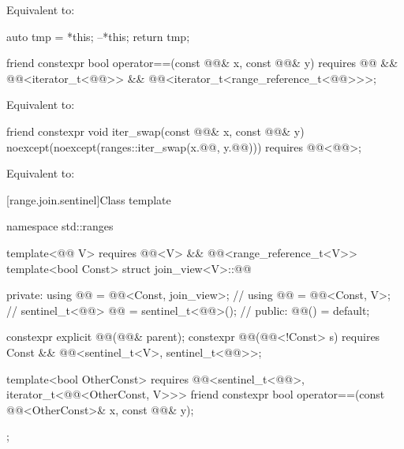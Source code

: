\begin{itemdescr}
\pnum
\effects
Equivalent to:
\begin{codeblock}
auto tmp = *this;
--*this;
return tmp;
\end{codeblock}
\end{itemdescr}

%
\begin{itemdecl}
friend constexpr bool operator==(const @@& x, const @@& y)
  requires @@ && @@<iterator_t<@@>> &&
           @@<iterator_t<range_reference_t<@@>>>;
\end{itemdecl}

\begin{itemdescr}
\pnum
\effects
Equivalent to:
\end{itemdescr}

%
\begin{itemdecl}
friend constexpr void iter_swap(const @@& x, const @@& y)
  noexcept(noexcept(ranges::iter_swap(x.@@, y.@@)))
  requires @@<@@>;
\end{itemdecl}

\begin{itemdescr}
\pnum
\effects
Equivalent to: 
\end{itemdescr}

[range.join.sentinel]{Class template }

%
\begin{codeblock}
namespace std::ranges {
  template<@@ V>
    requires @@<V> && @@<range_reference_t<V>>
  template<bool Const>
  struct join_view<V>::@@ {
  private:
    using @@ = @@<Const, join_view>;       // \expos
    using @@ = @@<Const, V>;                 // \expos
    sentinel_t<@@> @@ = sentinel_t<@@>();         // \expos
  public:
    @@() = default;

    constexpr explicit @@(@@& parent);
    constexpr @@(@@<!Const> s)
      requires Const && @@<sentinel_t<V>, sentinel_t<@@>>;

    template<bool OtherConst>
      requires @@<sentinel_t<@@>, iterator_t<@@<OtherConst, V>>>
    friend constexpr bool operator==(const @@<OtherConst>& x, const @@& y);
  };
}
\end{codeblock}

